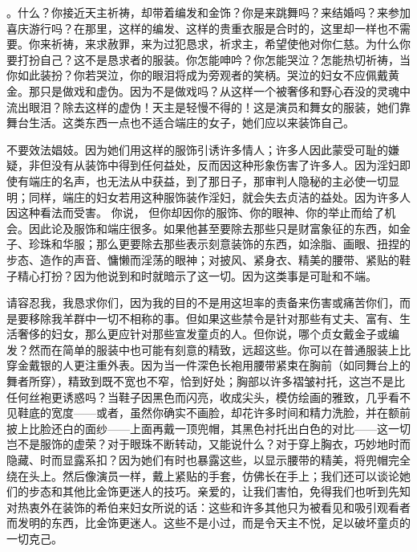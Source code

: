。什么？你接近天主祈祷，却带着编发和金饰？你是来跳舞吗？来结婚吗？来参加喜庆游行吗？在那里，这样的编发、这样的贵重衣服是合时的，这里却一样也不需要。你来祈祷，来求赦罪，来为过犯恳求，祈求主，希望使他对你仁慈。为什么你要打扮自己？这不是恳求者的服装。你怎能呻吟？你怎能哭泣？怎能热切祈祷，当你如此装扮？你若哭泣，你的眼泪将成为旁观者的笑柄。哭泣的妇女不应佩戴黄金。那只是做戏和虚伪。因为不是做戏吗？从这样一个被奢侈和野心吞没的灵魂中流出眼泪？除去这样的虚伪！天主是轻慢不得的！这是演员和舞女的服装，她们靠舞台生活。这类东西一点也不适合端庄的女子，她们应以来装饰自己。\par

不要效法娼妓。因为她们用这样的服饰引诱许多情人；许多人因此蒙受可耻的嫌疑，非但没有从装饰中得到任何益处，反而因这种形象伤害了许多人。因为淫妇即使有端庄的名声，也无法从中获益，到了那日子，那审判人隐秘的主必使一切显明；同样，端庄的妇女若用这种服饰装作淫妇，就会失去贞洁的益处。因为许多人因这种看法而受害。 你说， 但你却因你的服饰、你的眼神、你的举止而给了机会。因此论及服饰和端庄很多。如果他甚至要除去那些只是财富象征的东西，如金子、珍珠和华服；那么更要除去那些表示刻意装饰的东西，如涂脂、画眼、扭捏的步态、造作的声音、慵懒而淫荡的眼神；对披风、紧身衣、精美的腰带、紧贴的鞋子精心打扮？因为他说到和时就暗示了这一切。因为这类事是可耻和不端。\par

请容忍我，我恳求你们，因为我的目的不是用这坦率的责备来伤害或痛苦你们，而是要移除我羊群中一切不相称的事。但如果这些禁令是针对那些有丈夫、富有、生活奢侈的妇女，那么更应针对那些宣发童贞的人。但你说，哪个贞女戴金子或编发？然而在简单的服装中也可能有刻意的精致，远超这些。你可以在普通服装上比穿金戴银的人更注重外表。因为当一件深色长袍用腰带紧束在胸前（如同舞台上的舞者所穿），精致到既不宽也不窄，恰到好处；胸部以许多褶皱衬托，这岂不是比任何丝袍更诱惑吗？当鞋子因黑色而闪亮，收成尖头，模仿绘画的雅致，几乎看不见鞋底的宽度——或者，虽然你确实不画脸，却花许多时间和精力洗脸，并在额前披上比脸还白的面纱——上面再戴一顶兜帽，其黑色衬托出白色的对比——这一切岂不是服饰的虚荣？对于眼珠不断转动，又能说什么？对于穿上胸衣，巧妙地时而隐藏、时而显露系扣？因为她们有时也暴露这些，以显示腰带的精美，将兜帽完全绕在头上。然后像演员一样，戴上紧贴的手套，仿佛长在手上；我们还可以谈论她们的步态和其他比金饰更迷人的技巧。亲爱的，让我们害怕，免得我们也听到先知对热衷外在装饰的希伯来妇女所说的话：这些和许多其他只为被看见和吸引观看者而发明的东西，比金饰更迷人。这些不是小过，而是令天主不悦，足以破坏童贞的一切克己。\par

